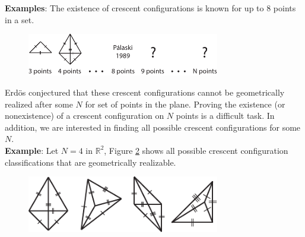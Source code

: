 \documentclass[12pt]{article}
\begin{document}
\noindent \textbf{Examples}: The existence of crescent configurations is known for up to 8 points in a set. 

\begin{figure}[H]
\centering
\includegraphics[width=0.75\textwidth]{1CrescentExamples.pdf}
\caption{}
\label{examples}
\end{figure}

\noindent Erd\"os conjectured that these crescent configurations cannot be geometrically realized after some $N$ for set of points in the plane. Proving the existence (or nonexistence) of a crescent configuration on $N$ points is a difficult task. In addition, we are interested in finding all possible crescent configurations for some $N$. \\

\noindent \textbf{Example}: Let $N=4$ in $\mathbb{R}^2$, Figure \ref{4points} shows all possible crescent configuration classifications that are geometrically realizable. 

\begin{figure}[H]
\centering
\includegraphics[width=0.75\textwidth]{1Crescent4Points.pdf}
\caption{}
\label{4points}
\end{figure}
\end{document}

